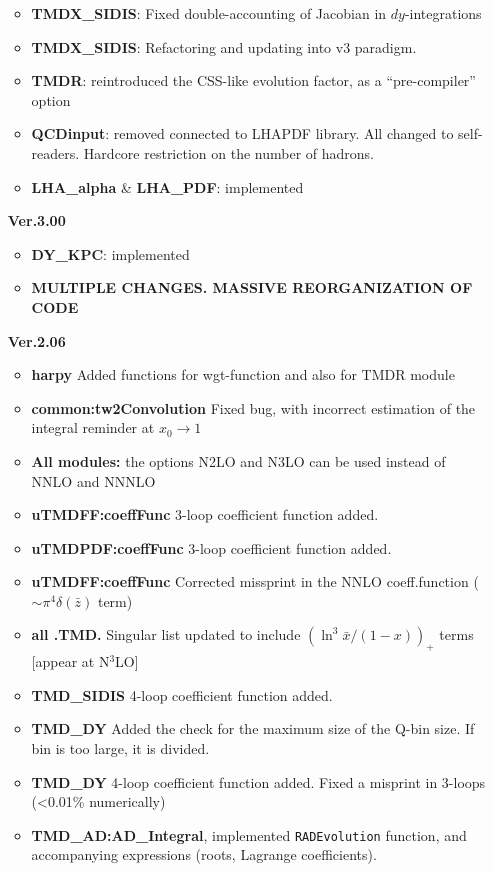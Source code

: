 \documentclass[prd,nofootinbib,eqsecnum,final]{revtex4}
\renewcommand{\(}{\left(}
\renewcommand{\)}{\right)}
\renewcommand{\[}{\left[}
\renewcommand{\]}{\right]}
\newcommand{\blue}[1]{{\color{blue} #1}}
\begin{document}
\begin{itemize}
\begin{itemize}
	\item \textbf{TMDX\_SIDIS}: Fixed double-accounting of Jacobian in $dy$-integrations
	\item \textbf{TMDX\_SIDIS}: Refactoring and updating into v3 paradigm.
	\item \textbf{TMDR}: reintroduced the CSS-like evolution factor, as a ``pre-compiler'' option 
	\item \textbf{QCDinput}: removed connected to LHAPDF library. All changed to self-readers. Hardcore restriction on the number of hadrons.
	\item \textbf{LHA\_alpha} \& \textbf{LHA\_PDF}: implemented
\end{itemize}
\item[\textbf{Ver.3.00}]
\begin{itemize}
	\item \textbf{DY\_KPC}: implemented
	\item \blue{\textbf{MULTIPLE CHANGES. MASSIVE REORGANIZATION OF CODE}}
\end{itemize}
\item[\textbf{Ver.2.06}]
\begin{itemize}
	\item \textbf{harpy} Added functions for wgt-function and also for TMDR module
	\item \textbf{common:tw2Convolution} Fixed bug, with incorrect estimation of the integral reminder at $x_0\to 1$
	\item \textbf{All modules:} the options N2LO and N3LO can be used instead of NNLO and NNNLO
	\item \textbf{uTMDFF:coeffFunc} 3-loop coefficient function added. 
	\item \textbf{uTMDPDF:coeffFunc} 3-loop coefficient function added.
	\item \textbf{uTMDFF:coeffFunc} Corrected missprint in the NNLO coeff.function ($\sim\pi^4\delta(\bar z)$ term)  
	\item \textbf{all .TMD.} Singular list updated to include $(\ln^3\bar x/(1-x))_+$ terms [appear at N$^3$LO]
	\item \textbf{TMD\_SIDIS} 4-loop coefficient function added. 
	\item \textbf{TMD\_DY} Added the check for the maximum size of the Q-bin size. If bin is too large, it is divided.
	\item \textbf{TMD\_DY} 4-loop coefficient function added. Fixed a misprint in 3-loops (<0.01\% numerically)
	\item \textbf{TMD\_AD:AD\_Integral}, implemented \texttt{RADEvolution} function, and accompanying expressions (roots, Lagrange coefficients).

\end{itemize}
\end{itemize}
\end{document}
